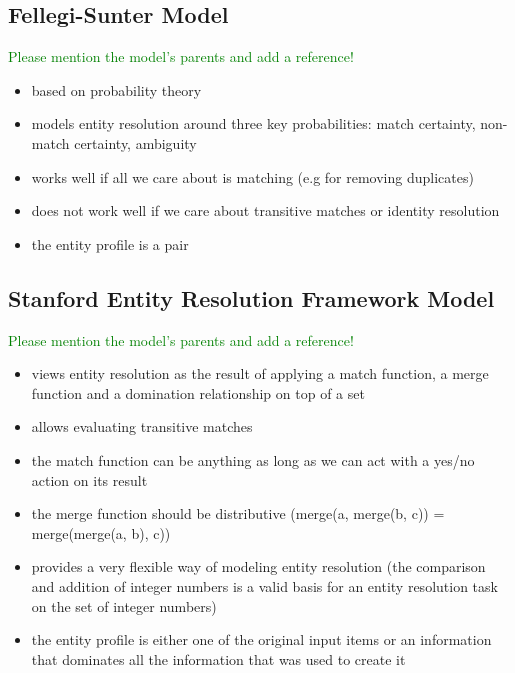 \documentclass[11pt]{article}
\begin{document}
    \subsection[fsm]{Fellegi-Sunter Model}\label{subsec:fsm}

    \textcolor{green}{Please mention the model's parents and add a reference!}
    \begin{itemize}
        \item based on probability theory
        \item models entity resolution around three key probabilities: match certainty, non-match certainty, ambiguity
        \item works well if all we care about is matching (e.g for removing duplicates)
        \item does not work well if we care about transitive matches or identity resolution
        \item the entity profile is a pair
    \end{itemize}

    \subsection[serf]{Stanford Entity Resolution Framework Model}\label{subsec:serf}

    \textcolor{green}{Please mention the model's parents and add a reference!}
    \begin{itemize}
        \item views entity resolution as the result of applying a match function, a merge function and a domination relationship on top of a set
        \item allows evaluating transitive matches
        \item the match function can be anything as long as we can act with a yes/no action on its result
        \item the merge function should be distributive (merge(a, merge(b, c)) = merge(merge(a, b), c))
        \item provides a very flexible way of modeling entity resolution (the comparison and addition of integer numbers is a valid basis for an entity resolution task on the set of integer numbers)
        \item the entity profile is either one of the original input items or an information that dominates all the information that was used to create it
    \end{itemize}
\end{document}
